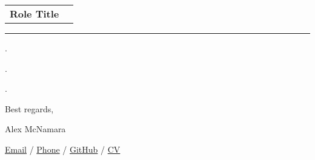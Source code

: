 \documentclass[12pt]{article}
\makeatletter
\newenvironment{justifycolumns}
{\begin{tabular*}{\textwidth}{@{\extracolsep{\fill}} lr@{}}}
{\end{tabular*}}
\newcommand{\row}[2]{#1 & #2 \\}
\newcommand{\blockseparation}{\vspace{0.13in}}
\newcommand{\p}{\hspace{0.5in}} %
\makeatother
\begin{document}
\begin{flushleft}

\begin{justifycolumns}
  \row{\textbf{Role Title}}{\raisebox{-0.08in}{}}
\end{justifycolumns}

\blockseparation
\hrule

\setlength{\parskip}{8pt}
\vspace{0.25in}

\p .

\p .

\p .

\vspace{0.35in}
\setlength{\parskip}{0pt}

Best regards,

Alex McNamara

\href{mailto:alex.mcnamara@gmail.com}{Email} / 
\href{tel:15107387344}{Phone} / 
\href{https://github.com/amcnamara/}{GitHub} / 
\href{https://github.com/amcnamara/amcnamara/blob/main/artifacts/amcnamara_cv.pdf?raw=true}{CV}

\end{flushleft}
\end{document}
